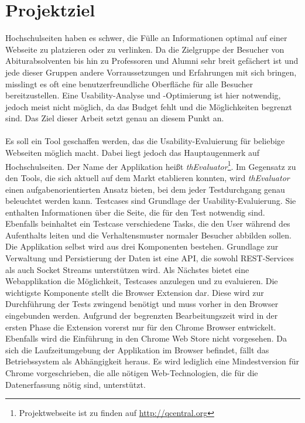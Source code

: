 %
%
%
%

\section{Projektziel}

Hochschulseiten haben es schwer, die Fülle an Informationen optimal auf einer Webseite zu platzieren oder zu verlinken. Da die Zielgruppe der Besucher von Abiturabsolventen bis hin zu Professoren und Alumni sehr breit gefächert ist und jede dieser Gruppen andere Vorraussetzungen und Erfahrungen mit sich bringen, misslingt es oft eine benutzerfreundliche Oberfläche für alle Besucher bereitzustellen. Eine Usability-Analyse und -Optimierung ist hier notwendig, jedoch meist nicht möglich, da das Budget fehlt und die Möglichkeiten begrenzt sind. Das Ziel dieser Arbeit setzt genau an diesem Punkt an.\\
\\
Es soll ein Tool geschaffen werden, das die Usability-Evaluierung für beliebige Webseiten möglich macht. Dabei liegt jedoch das Hauptaugenmerk auf Hochschulseiten. Der Name der Applikation heißt \textit{thEvaluator}\footnote{Projektwebseite ist zu finden auf \url{http://qcentral.org}}. Im Gegensatz zu den Tools, die sich aktuell auf dem Markt etablieren konnten, wird \textit{thEvaluator} einen aufgabenorientierten Ansatz bieten, bei dem jeder Testdurchgang genau beleuchtet werden kann. Testcases sind Grundlage der Usability-Evaluierung. Sie enthalten Informationen über die Seite, die für den Test notwendig sind. Ebenfalls beinhaltet ein Testcase verschiedene  Tasks, die den User während des Aufenthalts leiten und die Verhaltensmuster normaler Besucher abbilden sollen. Die Applikation selbst wird aus drei Komponenten bestehen. Grundlage zur Verwaltung und Persistierung der Daten ist eine API, die sowohl REST-Services als auch Socket Streams unterstützen wird. Als Nächstes bietet eine Webapplikation die Möglichkeit, Testcases anzulegen und zu evaluieren. Die wichtigste Komponente stellt die Browser Extension dar. Diese wird zur Durchführung der Tests zwingend benötigt und muss vorher in den Browser eingebunden werden. Aufgrund der begrenzten Bearbeitungszeit wird in der ersten Phase die Extension vorerst nur für den Chrome Browser entwickelt. Ebenfalls wird die Einführung in den Chrome Web Store nicht vorgesehen. Da sich die Laufzeitumgebung der Applikation im Browser befindet, fällt das Betriebssystem als Abhängigkeit heraus. Es wird lediglich eine Mindestversion für Chrome vorgeschrieben, die alle nötigen Web-Technologien, die für die Datenerfassung nötig sind, unterstützt.\\
